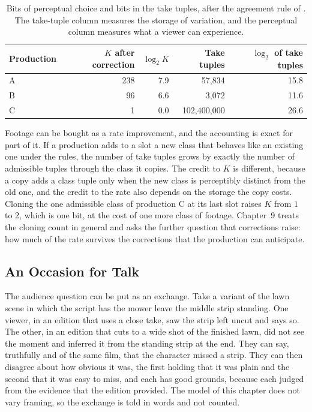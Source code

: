 \documentclass[11pt,twoside,openright]{book}
\theoremstyle{plain}
\theoremstyle{definition}
\theoremstyle{remark}
\begin{document}
\begin{table}[ht]
\centering
\begin{tabular}{@{}lrrrr@{}}
\toprule
Production & $K$ after correction & $\log_2K$ & Take tuples & $\log_2$ of take tuples\\
\midrule
A & 238 & 7.9 & 57,834 & 15.8\\
B & 96 & 6.6 & 3,072 & 11.6\\
C & 1 & 0.0 & 102,400,000 & 26.6\\
\bottomrule
\end{tabular}
\caption{Bits of perceptual choice and bits in the take tuples, after the agreement rule of . The take-tuple column measures the storage of variation, and the perceptual column measures what a viewer can experience.}\label{tab:rate}
\end{table}

Footage can be bought as a rate improvement, and the accounting is exact for part of it. If a production adds to a slot a new class that behaves like an existing one under the rules, the number of take tuples grows by exactly the number of admissible tuples through the class it copies. The credit to $K$ is different, because a copy adds a class tuple only when the new class is perceptibly distinct from the old one, and the credit to the rate also depends on the storage the copy costs. Cloning the one admissible class of production C at its last slot raises $K$ from $1$ to $2$, which is one bit, at the cost of one more class of footage. Chapter~9 treats the cloning count in general and asks the further question that corrections raise: how much of the rate survives the corrections that the production can anticipate.

\subsection{An Occasion for Talk}

The audience question can be put as an exchange. Take a variant of the lawn scene in which the script has the mower leave the middle strip standing. One viewer, in an edition that uses a close take, saw the strip left uncut and says so. The other, in an edition that cuts to a wide shot of the finished lawn, did not see the moment and inferred it from the standing strip at the end. They can say, truthfully and of the same film, that the character missed a strip. They can then disagree about how obvious it was, the first holding that it was plain and the second that it was easy to miss, and each has good grounds, because each judged from the evidence that the edition provided. The model of this chapter does not vary framing, so the exchange is told in words and not counted.
\end{document}
